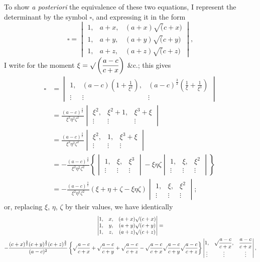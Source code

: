 \documentclass[11pt]{article}
\begin{document}
To show \textit{a posteriori} the equivalence of these two equations, I represent the determinant by the symbol $\square$, and expressing it in the form
\[
\square =
\begin{vmatrix}
1, & a+x, & (a+x)\surd(c+x) \\
1, & a+y, & (a+y)\surd(c+y) \\
1, & a+z, & (a+z)\surd(c+z)
\end{vmatrix},
\]
I write for the moment $\xi = \surd\left(\dfrac{a-c}{c+x}\right)$ \&c.; this gives
\begin{align*}
\square &=
\begin{vmatrix}
1, & (a-c)\left(1+\frac{1}{\xi^2}\right), & (a-c)^{\frac{3}{2}}\left(\frac{1}{\xi}+\frac{1}{\xi^3}\right) \\
\vdots & \vdots & \vdots
\end{vmatrix}\\
&= \frac{(a-c)^{\frac{3}{2}}}{\xi^2\eta^2\zeta^2}
\begin{vmatrix}
\xi^2, & \xi^2+1, & \xi^3+\xi \\
\vdots & \vdots & \vdots
\end{vmatrix}\\
&= \frac{(a-c)^{\frac{3}{2}}}{\xi^2\eta^2\zeta^2}
\begin{vmatrix}
\xi^2, & 1, & \xi^3+\xi \\
\vdots & \vdots & \vdots
\end{vmatrix}\\
&= -\frac{(a-c)^{\frac{3}{2}}}{\xi^2\eta^2\zeta^2}
\left\{
\begin{vmatrix}
1, & \xi, & \xi^3 \\
\vdots & \vdots & \vdots
\end{vmatrix}
- \xi\eta\zeta
\begin{vmatrix}
1, & \xi, & \xi^2 \\
\vdots & \vdots & \vdots
\end{vmatrix}
\right\}\\
&= -\frac{(a-c)^{\frac{3}{2}}}{\xi^2\eta^2\zeta^2}(\xi+\eta+\zeta-\xi\eta\zeta)
\begin{vmatrix}
1, & \xi, & \xi^2 \\
\vdots & \vdots & \vdots
\end{vmatrix};
\end{align*}
or, replacing $\xi$, $\eta$, $\zeta$ by their values, we have identically
\begin{multline*}
\begin{vmatrix}
1, & x, & (a+x)\surd(c+x) \\
1, & y, & (a+y)\surd(c+y) \\
1, & z, & (a+z)\surd(c+z)
\end{vmatrix} = \\
- \frac{(c+x)^{\frac{3}{2}}(c+y)^{\frac{3}{2}}(c+z)^{\frac{3}{2}}}{(a-c)^2}
\left\{
\surd\frac{a-c}{c+x} + \surd\frac{a-c}{c+y} + \surd\frac{a-c}{c+z}
- \surd\frac{a-c}{c+x}\surd\frac{a-c}{c+y}\surd\frac{a-c}{c+z}
\right\}
\begin{vmatrix}
1, & \surd\dfrac{a-c}{c+x}, & \dfrac{a-c}{c+x} \\
\vdots & \vdots & \vdots
\end{vmatrix},
\end{multline*}
\end{document}
